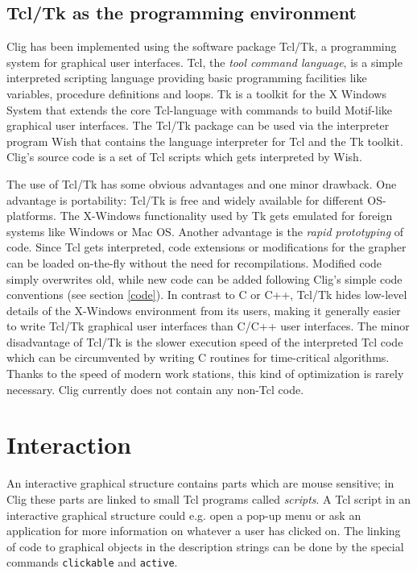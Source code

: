 \subsection{Tcl/Tk as the programming environment}

{\sc Clig} has been implemented using the software package {\sc
Tcl/Tk}, a programming system for graphical user interfaces. {\sc
Tcl}, the {\it tool command language\/}, is a simple interpreted
scripting language providing basic programming facilities like
variables, procedure definitions and loops.  {\sc Tk} is a toolkit for
the X Windows System that extends the core {\sc Tcl}-language with
commands to build Motif-like graphical user interfaces. The {\sc
Tcl/Tk} package can be used via the interpreter program {\sc Wish}
that contains the language interpreter for {\sc Tcl} and the {\sc Tk}
toolkit. {\sc Clig}'s source code is a set of {\sc Tcl} scripts which
gets interpreted by {\sc Wish}.

The use of Tcl/Tk has some obvious advantages and one minor drawback.
One advantage is portability: {\sc Tcl/Tk} is free and widely available
for different OS-platforms. The X-Windows functionality used by {\sc
Tk} gets emulated for foreign systems like Windows or Mac OS. Another
advantage is the {\it rapid prototyping\/} of code. Since {\sc Tcl}
gets interpreted, code extensions or modifications for the grapher can
be loaded on-the-fly without the need for recompilations. Modified code
simply overwrites old, while new code can be added following {\sc
Clig}'s simple code conventions (see section \ref{code}).  In contrast
to C or C++, {\sc Tcl/Tk} hides low-level details of the X-Windows
environment from its users, making it generally easier to write {\sc
Tcl/Tk} graphical user interfaces than C/C++ user interfaces.  The
minor disadvantage of {\sc Tcl/Tk} is the slower execution speed of the
interpreted {\sc Tcl} code which can be circumvented by writing C
routines for time-critical algorithms. Thanks to the speed of modern
work stations, this kind of optimization is rarely necessary. {\sc
Clig} currently does not contain any non-{\sc Tcl} code.

\section{Interaction}
\label{interact}

An interactive graphical structure contains parts which are mouse
sensitive; in {\sc Clig} these parts are linked to small {\sc Tcl}
programs called {\it scripts}. A {\sc Tcl} script in an interactive
graphical structure could e.g. open a pop-up menu or ask an application
for more information on whatever a user has clicked on. The linking of
code to graphical objects in the description strings can be done by the
special commands {\tt clickable} and {\tt active}.

